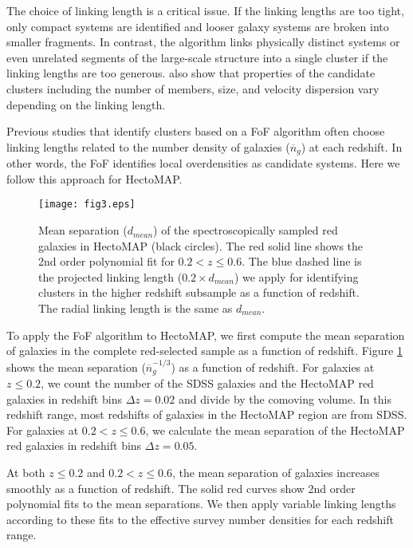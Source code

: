 \documentclass[iop, apj]{emulateapj}
\begin{document}
The choice of linking length is a critical issue.  
If the linking lengths are too tight, 
 only compact systems are identified and 
 looser galaxy systems are broken into smaller fragments.
In contrast, 
 the algorithm links physically distinct systems or 
 even unrelated segments of the large-scale structure into a single cluster
 if the linking lengths are too generous.
\citet{Diaferio99a} also show that 
 properties of the candidate clusters 
 including the number of members, size, and velocity dispersion vary
 depending on the linking length. 
 
Previous studies that identify clusters based on a FoF algorithm 
 often choose linking lengths 
 related to the number density of galaxies ($\overline{n}_{g}$) at each redshift. 
In other words, the FoF identifies local overdensities as candidate systems.
Here we follow this approach for HectoMAP.

\begin{figure}
\centering
\texttt{[image: fig3.eps]}
\caption{Mean separation ($d_{mean}$) of the spectroscopically sampled red galaxies in HectoMAP (black circles). 
The red solid line shows the 2nd order polynomial fit for $0.2 < z \leq 0.6$.
The blue dashed line is the projected linking length ($0.2 \times d_{mean}$)
 we apply for identifying clusters in the higher redshift subsample
 as a function of redshift. 
The radial linking length is the same as $d_{mean}$. }
\label{dmean}
\end{figure}

To apply the FoF algorithm to HectoMAP,
 we first compute the mean separation of galaxies 
 in the complete red-selected sample as a function of redshift.
Figure \ref{dmean} shows the mean separation ($\overline{n}_{g}^{-1/3}$) 
 as a function of redshift.
For galaxies at $z \leq 0.2$, 
 we count the number of the SDSS galaxies and the HectoMAP red galaxies 
 in redshift bins $\Delta z = 0.02$ and divide by the comoving volume. 
In this redshift range, 
 most redshifts of galaxies in the HectoMAP region are from SDSS.  
For galaxies at $0.2 < z \leq 0.6$, 
 we calculate the mean separation of the HectoMAP red galaxies in redshift bins $\Delta z = 0.05$. 
 
At both $z \leq 0.2$ and $0.2 < z \leq 0.6$, 
 the mean separation of galaxies increases smoothly as a function of redshift. 
The solid red curves show 
 2nd order polynomial fits to the mean separations. 
We then apply variable linking lengths
 according to these fits to the 
 effective survey number densities for each redshift range. 
  
\end{document}
